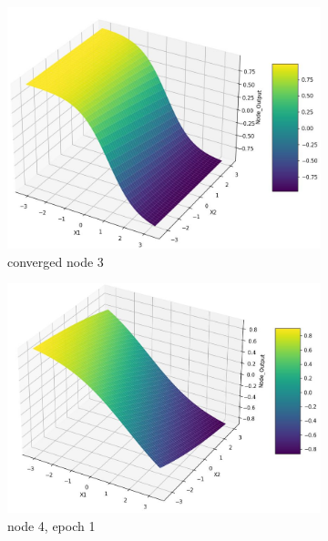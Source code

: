 \documentclass[11pt]{article}
\begin{document}
\begin{figure}[h]
\begin{subfigure}[b]{0.18\textwidth}
	\includegraphics[scale=0.14]{hidden1_n3_c.jpg}
	\caption{converged node 3}
	\label{fig:fig2.1.4.15}
	\end{subfigure}
	\begin{subfigure}[b]{0.18\textwidth}
	\centering
	\includegraphics[scale=0.14]{hidden1_n4_e1.jpg}
	\caption{node 4, epoch 1}
	\label{fig:fig2.1.4.16}
	\end{subfigure}
	\begin{subfigure}[b]{0.18\textwidth}
	\centering

\end{subfigure}
\end{figure}
\end{document}
